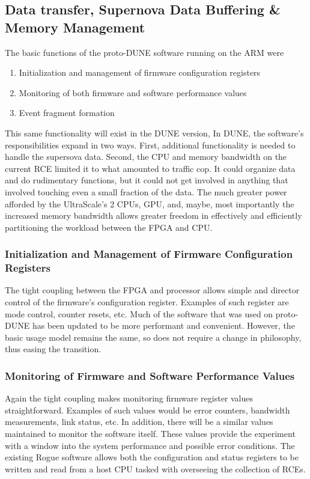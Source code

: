 \subsection{Data transfer, Supernova Data Buffering \& Memory Management}

The basic functions of the proto-DUNE software running on the ARM were
\begin{enumerate}
   \item Initialization and management of firmware configuration registers
   \item Monitoring of both firmware and software performance values
   \item Event fragment formation
\end{enumerate}

This same functionality will exist in the DUNE version, In DUNE, the software's responsibilities expand in two ways. First, additional functionality is needed to handle the supersova data\cite{SNTrig}.  Second, the CPU and memory bandwidth on the current RCE limited it to what amounted to traffic cop. It could organize data and do rudimentary functions, but it could not get involved in anything that involved touching even a small fraction of the data. The much greater power afforded by the UltraScale's 2 CPUs, GPU, and, maybe, most importantly the increased memory bandwidth allows greater freedom in effectively and efficiently partitioning the workload between the FPGA and CPU.

\subsubsection{Initialization and Management of Firmware Configuration Registers}
The tight coupling between the FPGA and processor allows simple and director control of the firmware's configuration register. Examples of such register are mode control, counter resets, etc. Much of the software that was used on proto-DUNE has been updated to be more performant and convenient.  However, the basic usage model remains the same, so does not require a change in philosophy, thus easing the transition.

\subsubsection{Monitoring of Firmware and Software Performance Values}
Again the tight coupling makes monitoring firmware register values straightforward.  Examples of such values would be error counters, bandwidth measurements, link status, etc.  In addition, there will be a similar values maintained to monitor the software itself.  These values provide the experiment with a window into the system performance and possible error conditions.  
The existing Rogue software allows both the configuration and status registers to be written and read from a host CPU tasked with overseeing the collection of RCEs.

